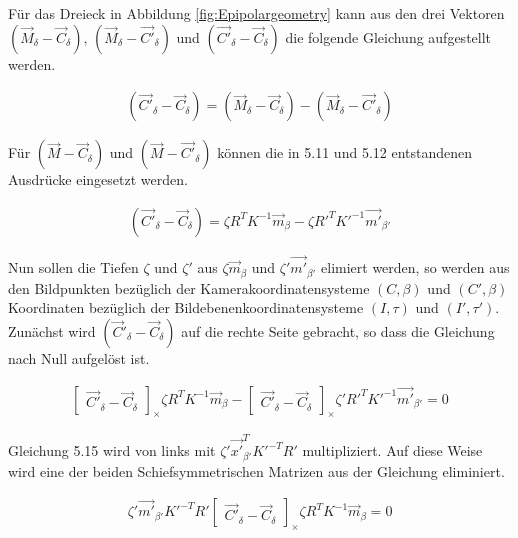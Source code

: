 Für das Dreieck in Abbildung \ref{fig:Epipolargeometry} kann aus den drei Vektoren $(\vec{M}_\delta - \vec{C}_\delta),\, (\vec{M}_\delta - \vec{C'}_\delta)$ und $(\vec{C'}_\delta - \vec{C}_\delta)$ die folgende Gleichung aufgestellt werden.

\begin{gather}
(\vec{C'}_\delta - \vec{C}_\delta) = (\vec{M}_\delta - \vec{C}_\delta) - (\vec{M}_\delta - \vec{C'}_\delta)
\end{gather}


Für $(\vec{M}-\vec{C}_\delta)$ und $(\vec{M} - \vec{C'}_\delta)$ können die in 5.11 und 5.12 entstandenen Ausdrücke eingesetzt werden.

\begin{gather}
(\vec{C'}_\delta - \vec{C}_\delta) = \zeta R^TK^{-1}\vec{m}_\beta - \zeta R'^TK'^{-1}\vec{m'}_{\beta'}
\end{gather}

Nun sollen die Tiefen $\zeta$ und $\zeta'$ aus $\zeta\vec{m}_\beta $ und $\zeta' \vec{m'}_{\beta'} $ elimiert werden, so werden aus den Bildpunkten bezüglich der Kamerakoordinatensysteme $(C,\beta)$ und $(C',\beta)$ Koordinaten bezüglich der Bildebenenkoordinatensysteme $(I,\tau)$ und $(I',\tau')$\cite{Elements}. Zunächst wird $(\vec{C}'_\delta - \vec{C}_\delta)$ auf die rechte Seite gebracht, so dass die Gleichung nach Null aufgelöst ist.


\begin{gather}
\begin{bmatrix}\vec{C'}_\delta - \vec{C}_\delta\end{bmatrix}_\times \zeta R^TK^{-1}\vec{m}_\beta - 
\begin{bmatrix}	\vec{C'}_\delta - \vec{C}_\delta\end{bmatrix}_\times \zeta' R'^TK'^{-1} \vec{m'}_{\beta'} =  0
\end{gather}

Gleichung 5.15 wird von links mit $\zeta' \vec{x'}^T_{\beta'}K'^{-T}R'$ multipliziert. Auf diese Weise wird eine der beiden Schiefsymmetrischen Matrizen aus der Gleichung eliminiert. 


\begin{gather}
\zeta' \vec{m'}_{\beta'} K'^{-T}R' \begin{bmatrix}	\vec{C'}_\delta - \vec{C}_\delta\end{bmatrix}_\times \zeta R^TK^{-1}\vec{m}_\beta = 0
\end{gather}


